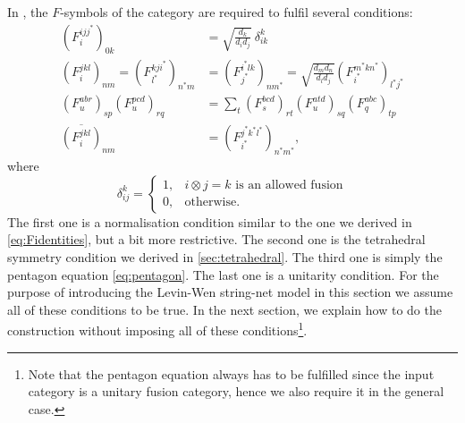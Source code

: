 In \cite{Levin2005}, the $F$-symbols of the category are required to fulfil several conditions:
	\begin{align}
		\left(F_i^{ijj^*}\right)_{0k}&=\sqrt{\frac{d_k}{d_i d_j}}\ \delta_{ik}^k \label{eq:LWcond1}\\
		\left(F_i^{jkl}\right)_{nm}=\left(F_{l^*}^{kji^*}\right)_{n^*m}&=\left(F_{j^*}^{i^*lk}\right)_{nm^*}=\sqrt{\frac{d_md_n}{d_ld_j}}\left(F_{i^*}^{m^*kn^*}\right)_{l^*j^*} \label{eq:LWcond2}\\
		\left(F_u^{abr}\right)_{sp}\left(F_u^{pcd}\right)_{rq}&=\sum_t \left(F_s^{bcd}\right)_{rt}\left(F_u^{atd}\right)_{sq}\left(F_q^{abc}\right)_{tp} \label{eq:LWcond3}\\
		\overline{\left(F_i^{jkl}\right)}_{nm}&=\left(F_{i^*}^{j^*k^*l^*}\right)_{n^*m^*} \label{eq:LWcond4},
	\end{align}
where  
	\begin{equation}
	\label{eq:delta}
		\delta_{ij}^k=\begin{cases}
		1, & i\otimes j=k \text{ is an allowed fusion}\\
		0, &\mathrm{otherwise.}
		\end{cases}
	\end{equation}
The first one is a normalisation condition similar to the one we derived in \cref{eq:Fidentities}, but a bit more restrictive. The second one is the tetrahedral symmetry condition we derived in \cref{sec:tetrahedral}. The third one is simply the pentagon equation \cref{eq:pentagon}. The last one is a unitarity condition. For the purpose of introducing the Levin-Wen string-net model in this section we assume all of these conditions to be true. In the next section, we explain how to do the construction without imposing all of these conditions\footnote{Note that the pentagon equation always has to be fulfilled since the input category is a unitary fusion category, hence we also require it in the general case.}.

